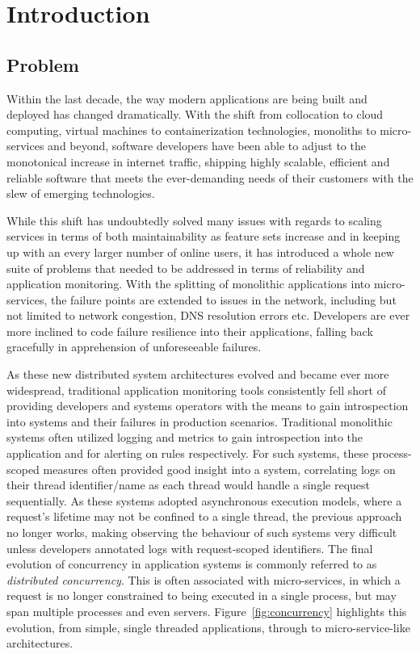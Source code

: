 \documentclass[12pt,pdftex,titlepage]{report}
\begin{document}
    \chapter{Introduction}
    \setcounter{page}{1}
        \section{Problem}
            Within the last decade, the way modern applications are being built and deployed has changed dramatically. With the shift from collocation to cloud computing,
            virtual machines to containerization technologies, monoliths to micro-services and beyond, software developers have been able to adjust to 
            the monotonical increase in internet traffic, shipping highly scalable, efficient and reliable software that meets the ever-demanding needs of their customers
            with the slew of emerging technologies.

            While this shift has undoubtedly solved many issues with regards to scaling services in terms of both maintainability as feature sets increase and in keeping up
            with an every larger number of online users, it has introduced a whole new suite of problems that needed to be addressed in terms of reliability and application 
            monitoring. With the splitting of monolithic applications into micro-services, the failure points are extended to issues in the network, including but not limited
            to network congestion, DNS resolution errors etc. Developers are ever more inclined to code failure resilience into their applications, falling back gracefully in 
            apprehension of unforeseeable failures.

            As these new distributed system architectures evolved and became ever more widespread, traditional application monitoring tools consistently fell short of providing
            developers and systems operators with the means to gain introspection into systems and their failures in production scenarios\cite{retrospective}. Traditional monolithic systems often
            utilized logging and metrics to gain introspection into the application and for alerting on rules respectively. For such systems, these process-scoped measures often 
            provided good insight into a system, correlating logs on their thread identifier/name as each thread would handle a single request sequentially. As these systems 
            adopted asynchronous execution models, where a request's lifetime may not be confined to a single thread, the previous approach no longer works, making observing
            the behaviour of such systems very difficult unless developers annotated logs with request-scoped identifiers. The final evolution of concurrency in application systems is
            commonly referred to as \textit{distributed concurrency}. This is often associated with micro-services, in which a request is no longer constrained to being executed
            in a single process, but may span multiple processes and even servers. Figure~\ref{fig:concurrency} highlights this evolution, from simple, single threaded applications,
            through to micro-service-like architectures.
\end{document}
